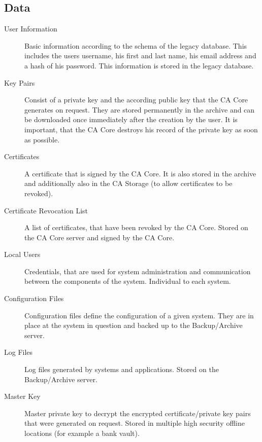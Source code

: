 \documentclass[a4paper, toc=index, 12pt, DIV14, twoside, BCOR2cm, headsepline, numbers=noenddot, bibliography=totoc]{scrbook}
\begin{document}
\subsection{Data}
\begin{description}
\item[User Information ] Basic information according to the schema of the legacy database. This includes the users username, his first and last name, his email address and a hash of his password. This information is stored in the legacy database.

\item[Key Pairs ] Consist of a private key and the according public key that the CA Core generates on request. They are stored permanently in the archive and can be downloaded once immediately after the creation by the user. It is important, that the CA Core destroys his record of the private key as soon as possible.

\item[Certificates ] A certificate that is signed by the CA Core. It is also stored in the archive and additionally also in the CA Storage (to allow certificates to be revoked).

\item[Certificate Revocation List ] A list of certificates, that have been revoked by the CA Core. Stored on the CA Core server and signed by the CA Core.

\item[Local Users ] Credentials, that are used for system administration and communication between the components of the system. Individual to each system.

\item[Configuration Files ] Configuration files define the configuration of a given system. They are in place at the system in question and backed up to the Backup/Archive server.

\item[Log Files ] Log files generated by systems and applications. Stored on the Backup/Archive server.

\item[Master Key ] Master private key to decrypt the encrypted certificate/private key pairs that were generated on request. Stored in multiple high security offline locations (for example a bank vault).
\end{description}
\end{document}

